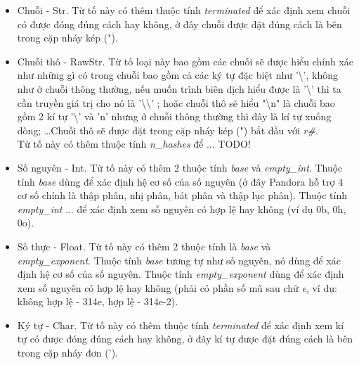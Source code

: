 \begin{itemize}
    \begin{itemize}
      \item Chuỗi - Str. Từ tố này có thêm thuộc tính \textit{terminated} để xác định 
      xem chuỗi có được đóng đúng cách hay không, ở đây chuỗi được đặt đúng cách là 
      bên trong cặp nháy kép (").
      \item Chuỗi thô - RawStr. Từ tố loại này bao gồm các chuỗi sẽ được hiểu chính xác 
      như những gì có trong chuỗi bao gồm cả các ký tự đặc biệt như '\textbackslash', 
      không như ở chuỗi thông thường, nếu muốn trình biên dịch hiểu được là 
      '\textbackslash' thì ta cần truyền giá trị cho nó là '\textbackslash\textbackslash'
      ; hoặc chuỗi thô sẽ hiểu "\textbackslash n" là chuỗi bao gồm 2 kí tự 
      '\textbackslash' và 'n' nhưng ở chuỗi thông thường thì đây là kí tự xuống dòng; 
      \dots\space Chuỗi thô sẽ được đặt trong cặp nháy kép (") bắt đầu với \textit{r\#}.
      \\Từ tố này có thêm thuộc tính \textit{n\_hashes} để ... TODO!
      \item Số nguyên - Int. Từ tố này có thêm 2 thuộc tính \textit{base} và 
      \textit{empty\_int}. Thuộc tính \textit{base} dùng để xác định hệ cơ số của số 
      nguyên (ở đây Pandora hỗ trợ 4 cơ số chính là thập phân, nhị phân, bát phân và 
      thập lục phân). Thuộc tính \textit{empty\_int} ... để xác định xem số nguyên có 
      hợp lệ hay không (ví dụ 0b, 0h, 0o).
      \item Số thực - Float. Từ tố này có thêm 2 thuộc tính là \textit{base} và \\
      \textit{empty\_exponent}. Thuộc tính \textit{base} tương tự như số nguyên, nó dùng 
      để xác định hệ cơ số của số nguyên. Thuộc tính \textit{empty\_exponent} dùng để 
      xác định xem số nguyên có hợp lệ hay không (phải có phần số mũ sau chữ \textit{e}, 
      ví dụ: không hợp lệ - 314e, hợp lệ - 314e-2).
      \item Ký tự - Char. Từ tố này có thêm thuộc tính \textit{terminated} để xác định 
      xem kí tự có được đóng đúng cách hay không, ở đây kí tự được đặt đúng cách là 
      bên trong cặp nháy đơn (').
      

\end{itemize}
\end{itemize}
